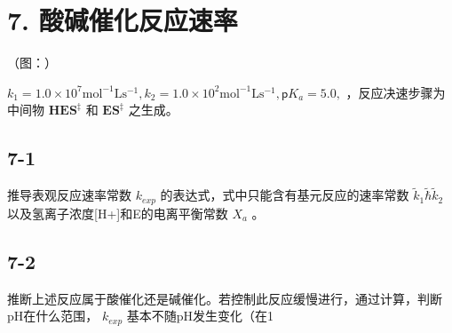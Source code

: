 \section*{7. 酸碱催化反应速率}
（图：）

$k _ { 1 } = 1 . 0 \times 1 0 ^ { 7 } \mathrm { m o l ^ { - 1 } L s ^ { - 1 } } , k _ { 2 } = 1 . 0 \times 1 0 ^ { 2 } \mathrm { m o l ^ { - 1 } L s ^ { - 1 } } , \mathsf { p } K _ { a } = 5 . 0 ,$ ，反应决速步骤为中间物 $\mathbf { H E S ^ { \ddagger } }$ 和 $\mathbf { E } \mathbf { S } ^ { \ddagger }$ 之⽣成。

\subsection*{7-1}
推导表观反应速率常数 $k _ { e x p }$ 的表达式，式中只能含有基元反应的速率常数 ${ \mathrm { \tilde { \mathbf { \mathit { k } } } } _ { 1 } \mathrm { \tilde { \hbar } } \mathrm { \tilde { \mathbf { \mathit { k } } } } _ { 2 } }$ 以及氢离⼦浓度[H+]和E的电离平衡常数 $X _ { a }$ 。

\subsection*{7-2}
推断上述反应属于酸催化还是碱催化。若控制此反应缓慢进⾏，通过计算，判断pH在什么范围， $k _ { e x p }$ 基本不随pH发⽣变化（在1%
